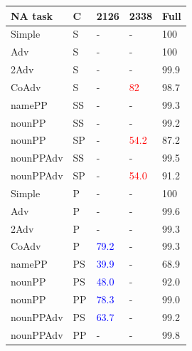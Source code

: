 \begin{center}
\begin{table}[ht]
\centering
\begin{tabular}{|P{2.3cm}|P{0.4cm}||P{0.6cm}|P{0.6cm}|P{0.6cm}|}
\hline
\B NA task & \B C & \B \unit{2}{\textbf{126}} & \B \unit{2}{\textbf{338}} & \B Full \\
\hline


Simple & S & - &  - &  100 \\

Adv & S & - &  - &  100 \\

2Adv & S & - &  - &  99.9 \\

CoAdv & S & - &  \textcolor{red}{82} &  98.7 \\

namePP & SS & - &  - &  99.3 \\

nounPP & SS & - &  - &  99.2 \\

nounPP & SP &  - &  \textcolor{red}{54.2} &  87.2 \\

nounPPAdv & SS &  - &  - & 99.5 \\

nounPPAdv & SP &  - &  \textcolor{red}{54.0} & 91.2 \\


\hline
Simple & P &  - &  - &  100 \\

Adv & P &  - &  - &  99.6 \\

2Adv & P & - &  - &  99.3 \\

CoAdv & P &  \textcolor{blue}{79.2} &  - &  99.3 \\

namePP & PS & \textcolor{blue}{39.9} &  - &  68.9 \\

nounPP & PS &  \textcolor{blue}{48.0} & - &  92.0 \\

nounPP & PP &  \textcolor{blue}{78.3} & - &  99.0 \\

nounPPAdv & PS & \textcolor{blue}{63.7} &  - &  99.2 \\

nounPPAdv & PP & - &  - &  99.8 \\


\end{tabular}
\end{table}
\end{center}
